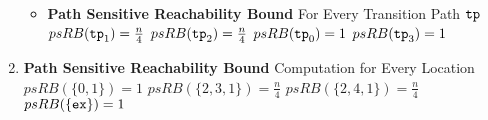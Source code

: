 \begin{enumerate}
\begin{itemize}
      \item \textbf{Path Sensitive Reachability Bound} For Every Transition Path $\mathtt{tp}$ 
      \\
      $psRB(\mathtt{tp}_1) = \frac{n}{4}$ \quad
      $psRB(\mathtt{tp}_2) = \frac{n}{4}$ \quad
      $psRB(\mathtt{tp}_0) = 1$ \quad
      $psRB(\mathtt{tp}_3) = 1$ 
    \end{itemize}
    \item \textbf{Path Sensitive Reachability Bound} Computation for Every Location
    \\
    $psRB(\{0, 1\}) = 1$ \quad
    $psRB(\{2, 3, 1 \}) = \frac{n}{4}$ \quad
    $psRB(\{2, 4, 1\}) = \frac{n}{4}$ \quad
    $psRB(\{\mathtt{ex}\}) = 1$ 
    \end{enumerate}

